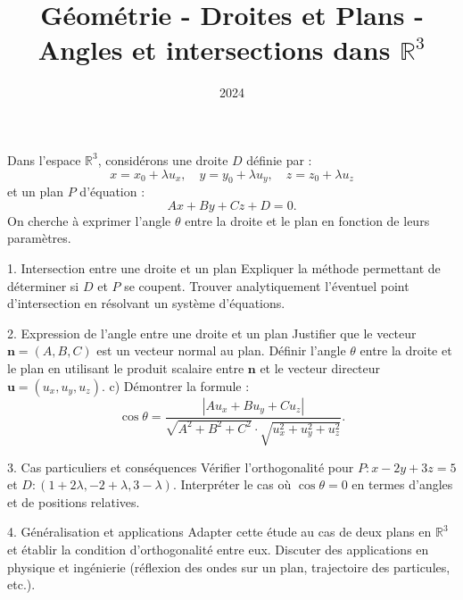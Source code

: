 \documentclass[10pt,a4paper]{article}
\title{Géométrie - Droites et Plans - Angles et intersections dans $\mathbb{R}^3$}
\author{}
\date{2024}
\begin{document}
\maketitle

Dans l'espace $\mathbb{R}^3$, considérons une droite $D$ définie par :
$$
x = x_0 + \lambda u_x, \quad y = y_0 + \lambda u_y, \quad z = z_0 + \lambda u_z
$$
et un plan $P$ d'équation :
$$
Ax + By + Cz + D = 0.
$$
On cherche à exprimer l'angle $\theta$ entre la droite et le plan en fonction de leurs paramètres.

1. Intersection entre une droite et un plan
  \ql Expliquer la méthode permettant de déterminer si $D$ et $P$ se coupent.
  \ql Trouver analytiquement l'éventuel point d'intersection en résolvant un système d'équations.

2. Expression de l'angle entre une droite et un plan
  \ql Justifier que le vecteur $\mathbf{n} = (A,B,C)$ est un vecteur normal au plan.
  \ql Définir l'angle $\theta$ entre la droite et le plan en utilisant le produit scalaire entre $\mathbf{n}$ et le vecteur directeur $\mathbf{u} = (u_x, u_y, u_z)$.
   c) Démontrer la formule :
   $$
   \cos \theta = \frac{|A u_x + B u_y + C u_z|}{\sqrt{A^2 + B^2 + C^2} \cdot \sqrt{u_x^2 + u_y^2 + u_z^2}}.
   $$

3. Cas particuliers et conséquences
  \ql Vérifier l'orthogonalité pour $P : x - 2y + 3z = 5$ et $D : (1+2\lambda, -2+\lambda, 3-\lambda)$.
  \ql Interpréter le cas où $\cos \theta = 0$ en termes d'angles et de positions relatives.

4. Généralisation et applications
  \ql Adapter cette étude au cas de deux plans en $\mathbb{R}^3$ et établir la condition d'orthogonalité entre eux.
  \ql Discuter des applications en physique et ingénierie (réflexion des ondes sur un plan, trajectoire des particules, etc.).
\end{document}
